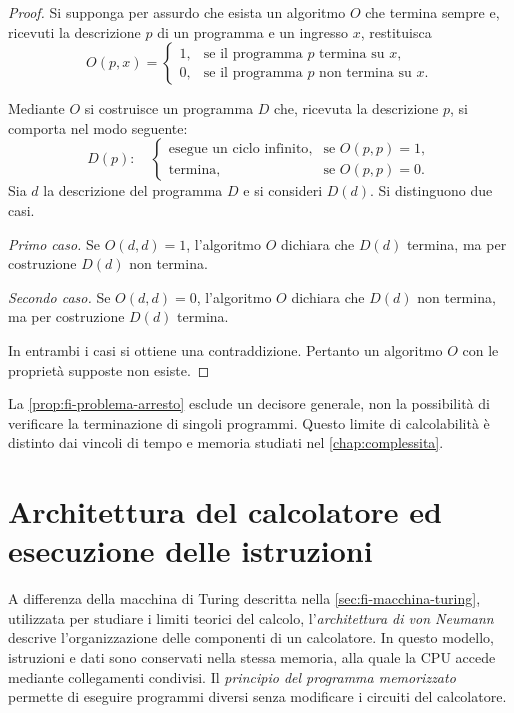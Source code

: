 \begin{proof}
Si supponga per assurdo che esista un algoritmo \(O\) che termina
sempre e, ricevuti la descrizione \(p\) di un programma e un ingresso
\(x\), restituisca
\[
  O(p,x)=
  \begin{cases}
    1, & \text{se il programma \(p\) termina su \(x\)},\\
    0, & \text{se il programma \(p\) non termina su \(x\)}.
  \end{cases}
\]

Mediante \(O\) si costruisce un programma \(D\) che, ricevuta la
descrizione \(p\), si comporta nel modo seguente:
\[
  D(p):\quad
  \begin{cases}
    \text{esegue un ciclo infinito}, & \text{se } O(p,p)=1,\\
    \text{termina}, & \text{se } O(p,p)=0.
  \end{cases}
\]
Sia \(d\) la descrizione del programma \(D\) e si consideri
\(D(d)\). Si distinguono due casi.

\emph{Primo caso.}
Se \(O(d,d)=1\), l'algoritmo \(O\) dichiara che \(D(d)\) termina,
ma per costruzione \(D(d)\) non termina.

\emph{Secondo caso.}
Se \(O(d,d)=0\), l'algoritmo \(O\) dichiara che \(D(d)\) non termina,
ma per costruzione \(D(d)\) termina.

In entrambi i casi si ottiene una contraddizione. Pertanto un
algoritmo \(O\) con le proprietà supposte non esiste.
\end{proof}

La \cref{prop:fi-problema-arresto} esclude un decisore generale,
non la possibilità di verificare la terminazione di singoli programmi.
Questo limite di calcolabilità è distinto dai vincoli di tempo e
memoria studiati nel \cref{chap:complessita}.

\section{Architettura del calcolatore ed esecuzione delle istruzioni}
\label{sec:fi-architettura-calcolatore}

A differenza della macchina di Turing descritta nella
\cref{sec:fi-macchina-turing}, utilizzata per studiare i limiti
teorici del calcolo, l'\emph{architettura di von Neumann} descrive
l'organizzazione delle componenti di un calcolatore. In questo
modello, istruzioni e dati sono conservati nella stessa memoria,
alla quale la CPU accede mediante collegamenti condivisi.
Il \emph{principio del programma memorizzato} permette di eseguire
programmi diversi senza modificare i circuiti del calcolatore.

